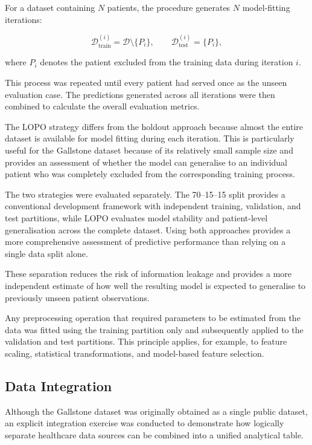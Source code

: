 For a dataset containing $N$ patients, the procedure generates $N$ model-fitting
iterations:

\[
\mathcal{D}_{\mathrm{train}}^{(i)}
=
\mathcal{D} \setminus \{P_i\},
\qquad
\mathcal{D}_{\mathrm{test}}^{(i)}
=
\{P_i\},
\]

where $P_i$ denotes the patient excluded from the training data during
iteration $i$.

This process was repeated until every patient had served once as the unseen
evaluation case. The predictions generated across all iterations were then
combined to calculate the overall evaluation metrics.

The LOPO strategy differs from the holdout approach because almost the entire
dataset is available for model fitting during each iteration. This is
particularly useful for the Gallstone dataset because of its relatively small
sample size and provides an assessment of whether the model can generalise to
an individual patient who was completely excluded from the corresponding
training process.

The two strategies were evaluated separately. The 70--15--15 split provides a
conventional development framework with independent training, validation, and
test partitions, while LOPO evaluates model stability and patient-level
generalisation across the complete dataset. Using both approaches provides a
more comprehensive assessment of predictive performance than relying on a
single data split alone.

These separation reduces the risk of information leakage and provides a more
independent estimate of how well the resulting model is expected to generalise
to previously unseen patient observations.

Any preprocessing operation that required parameters to be estimated from the
data was fitted using the training partition only and subsequently applied to
the validation and test partitions. This principle applies, for example, to
feature scaling, statistical transformations, and model-based feature
selection.


\subsection{Data Integration}
\label{subsec:data-integration}

Although the Gallstone dataset was originally obtained as a single public
dataset, an explicit integration exercise was conducted to demonstrate how
logically separate healthcare data sources can be combined into a unified
analytical table.

